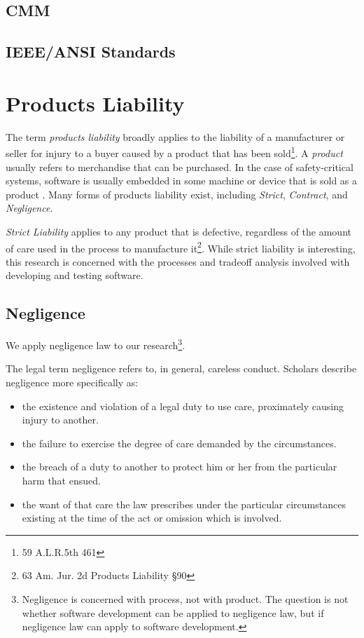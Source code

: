 \subsection{CMM}

\subsection{IEEE/ANSI Standards}

\section{Products Liability}
The term \textit{products liability} broadly applies to the liability of a
manufacturer or seller for injury to a buyer caused by a product that has been
sold\footnote{59 A.L.R.5th 461}. A \textit{product} usually refers to
merchandise that can be purchased. In the case of safety-critical systems,
software is usually embedded in some machine or device that is sold as a product
\cite{Leveson95}. Many forms of products liability exist, including
\textit{Strict}, \textit{Contract}, and \textit{Negligence}.

\textit{Strict Liability} applies to any product that is defective, regardless
of the amount of care used in the process to manufacture it\footnote{63 Am. Jur.
2d Products Liability \S 90}. While strict liability is interesting, this
research is concerned with the processes and tradeoff analysis involved with
developing and testing software. 

\subsection{Negligence}\label{S:Negligence}
We apply negligence law to our research\footnote{Negligence is 
concerned with process, not with product. The question is not whether software 
development can be applied to negligence law, but if negligence law can apply to
software development.}.

The legal term negligence refers to, in general, careless conduct. Scholars
describe negligence more specifically as:

\singlespace
\begin{itemize}
 \item the existence and violation of a legal duty to use care, proximately 
 causing injury to another.
 \item the failure to exercise the degree of care demanded by the circumstances.
 \item the breach of a duty to another to protect him or her from the particular
 harm that ensued.
 \item the want of that care the law prescribes under the particular
 circumstances existing at the time of the act or omission which is involved.
\end{itemize}
\doublespace

